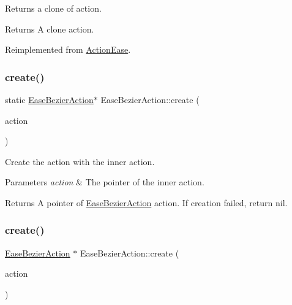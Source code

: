 Returns a clone of action.

\begin{DoxyReturn}{Returns}
A clone action. 
\end{DoxyReturn}


Reimplemented from \hyperlink{classActionEase_a39bec93fe161fb732a74d8e51a2fe08b}{Action\+Ease}.

\mbox{\label{classEaseBezierAction_a3a5c9f7c3061432ad649cda22daa5cd7}} 
\subsubsection{\texorpdfstring{create()}{create()}\hspace{0.1cm}{\footnotesize\ttfamily [1/2]}}
{\footnotesize\ttfamily static \hyperlink{classEaseBezierAction}{Ease\+Bezier\+Action}$\ast$ Ease\+Bezier\+Action\+::create (\begin{DoxyParamCaption}\item[{cocos2d\+::\+Action\+Interval $\ast$}]{action }\end{DoxyParamCaption})\hspace{0.3cm}{\ttfamily [static]}}



Create the action with the inner action. 


\begin{DoxyParams}{Parameters}
{\em action} & The pointer of the inner action. \\
\hline
\end{DoxyParams}
\begin{DoxyReturn}{Returns}
A pointer of \hyperlink{classEaseBezierAction}{Ease\+Bezier\+Action} action. If creation failed, return nil. 
\end{DoxyReturn}
\mbox{\label{classEaseBezierAction_a1928cb8f686f7add882625a4647b2708}} 
\subsubsection{\texorpdfstring{create()}{create()}\hspace{0.1cm}{\footnotesize\ttfamily [2/2]}}
{\footnotesize\ttfamily \hyperlink{classEaseBezierAction}{Ease\+Bezier\+Action} $\ast$ Ease\+Bezier\+Action\+::create (\begin{DoxyParamCaption}\item[{cocos2d\+::\+Action\+Interval $\ast$}]{action }\end{DoxyParamCaption})\hspace{0.3cm}{\ttfamily [static]}}



